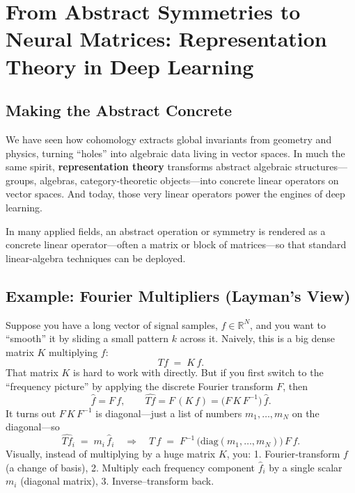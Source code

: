 \section{From Abstract Symmetries to Neural Matrices: Representation Theory in Deep Learning}

\subsection{Making the Abstract Concrete}

We have seen how cohomology extracts global invariants from geometry and physics, turning “holes” into algebraic data living in vector spaces.  In much the same spirit, \textbf{representation theory} transforms abstract algebraic structures—groups, algebras, category‐theoretic objects—into concrete linear operators on vector spaces.  And today, those very linear operators power the engines of deep learning.

In many applied fields, an abstract operation or symmetry is rendered as a concrete linear operator—often a matrix or block of matrices—so that standard linear-algebra techniques can be deployed.








\subsection{Example: Fourier Multipliers (Layman’s View)}  
Suppose you have a long vector of signal samples, \(f\in\mathbb R^N\), and you want to “smooth” it by sliding a small pattern \(k\) across it.  Naively, this is a big dense matrix \(K\) multiplying \(f\):
\[
Tf \;=\; K\,f.
\]
That matrix \(K\) is hard to work with directly.  But if you first switch to the “frequency picture” by applying the discrete Fourier transform \(F\), then
\[
\hat f = F\,f,\qquad
\widehat{Tf} = F\,(K\,f) = \bigl(F\,K\,F^{-1}\bigr)\,\hat f.
\]
It turns out \(F\,K\,F^{-1}\) is diagonal—just a list of numbers \(m_1,\dots,m_N\) on the diagonal—so
\[
\widehat{Tf}_i \;=\; m_i\,\hat f_i
\quad\Longrightarrow\quad
T\,f \;=\; F^{-1}\,\bigl(\mathrm{diag}(m_1,\dots,m_N)\bigr)\,F\,f.
\]
Visually, instead of multiplying by a huge matrix \(K\), you:
1. Fourier‐transform \(f\) (a change of basis),
2. Multiply each frequency component \(\hat f_i\) by a single scalar \(m_i\) (diagonal matrix),
3. Inverse–transform back.  

\medskip

